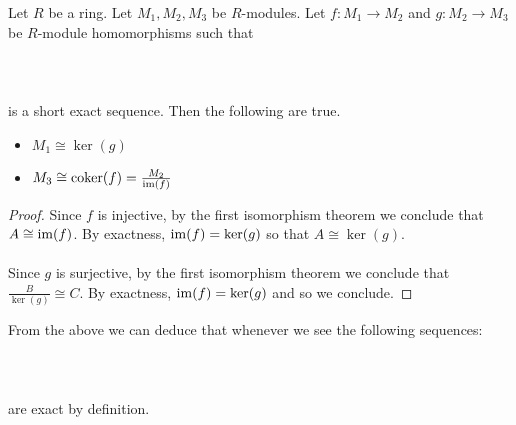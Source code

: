\documentclass[a4paper]{article}
\begin{document}
\begin{lmm}{}{} Let $R$ be a ring. Let $M_1,M_2,M_3$ be $R$-modules. Let $f:M_1\to M_2$ and $g:M_2\to M_3$ be $R$-module homomorphisms such that \\~\\
\\~\\
is a short exact sequence. Then the following are true. 
\begin{itemize}
\item $M_1\cong\ker(g)$
\item $M_3\cong\text{coker}(f)=\frac{M_2}{\operatorname{im}(f)}$
\end{itemize} 
\begin{proof}
Since $f$ is injective, by the first isomorphism theorem we conclude that $A\cong\operatorname{im}(f)$. By exactness, $\operatorname{im}(f)=\ker(g)$ so that $A\cong\ker(g)$. \\~\\

Since $g$ is surjective, by the first isomorphism theorem we conclude that $\frac{B}{\ker(g)}\cong C$. By exactness, $\operatorname{im}(f)=\ker(g)$ and so we conclude. 
\end{proof}
\end{lmm}

From the above we can deduce that whenever we see the following sequences: \\~\\
\\~\\
are exact by definition. 
\end{document}

